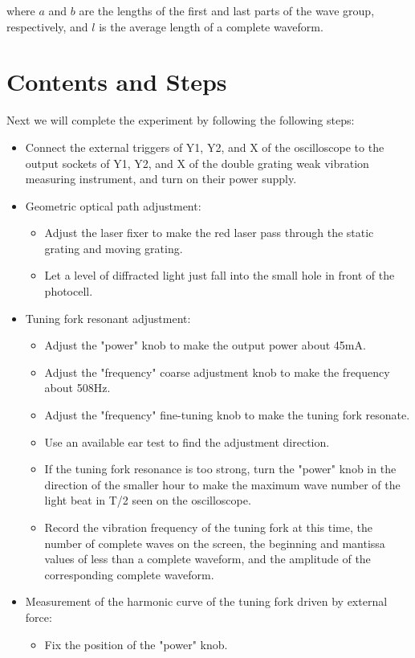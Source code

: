 \documentclass[UTF8]{article}
\begin{document}
   where $a$ and $b$ are the lengths of the first and last parts of the wave group, respectively, and $l$ is the average length of a complete waveform.
       
       
	\section{Contents and Steps}
	Next we will complete the experiment by following the following steps:
	\begin{itemize}
	\item Connect the external triggers of Y1, Y2, and X of the oscilloscope to the output sockets of Y1, Y2, and X of the double grating weak vibration measuring instrument, and turn on their power supply.
	\item Geometric optical path adjustment:
	\begin{itemize}
	\item Adjust the laser fixer to make the red laser pass through the static grating and moving grating.
	\item Let a level of diffracted light just fall into the small hole in front of the photocell.
	\end{itemize}
	\item Tuning fork resonant adjustment:
	\begin{itemize}
	\item Adjust the "power" knob to make the output power about 45mA.
	\item Adjust the "frequency" coarse adjustment knob to make the frequency about 508Hz.
	\item Adjust the "frequency" fine-tuning knob to make the tuning fork resonate.
	\item Use an available ear test to find the adjustment direction.
	\item If the tuning fork resonance is too strong, turn the "power" knob in the direction of the smaller hour to make the maximum wave number of the light beat in T/2 seen on the oscilloscope.
	\item Record the vibration frequency of the tuning fork at this time, the number of complete waves on the screen, the beginning and mantissa values of less than a complete waveform, and the amplitude of the corresponding complete waveform.
	\end{itemize}
	\item Measurement of the harmonic curve of the tuning fork driven by external force:
	\begin{itemize}
	\item Fix the position of the "power" knob.

\end{itemize}
\end{itemize}
\end{document}
